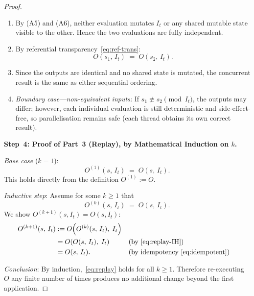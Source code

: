 \documentclass[12pt,openany]{book}
\newcommand{\calI}{\mathcal{I}}
\numberwithin{equation}{chapter}
\theoremstyle{plain}
\theoremstyle{definition}
\theoremstyle{remark}
\numberwithin{equation}{chapter}
\theoremstyle{plain}
\def\calI{I}%
\begin{document}
\begin{proof}
\begin{enumerate}
  \item By (A5) and (A6), neither evaluation mutates $\calI_t$ or any
        shared mutable state visible to the other.  Hence the two
        evaluations are fully independent.
  \item By referential transparency~\eqref{eq:ref-trans}:
        \begin{equation}
          O(s_1,\, \calI_t) \;=\; O(s_2,\, \calI_t).
          \label{eq:parallel-rt}
        \end{equation}
  \item Since the outputs are identical and no shared state is mutated,
        the concurrent result is the same as either sequential ordering.
  \item \emph{Boundary case---non-equivalent inputs:}
        If $s_1 \not\equiv s_2 \pmod{\calI_t}$, the outputs may
        differ; however, each individual evaluation is still
        deterministic and side-effect-free, so parallelisation remains
        safe (each thread obtains its own correct result).
\end{enumerate}

\medskip
\noindent\textbf{Step~4: Proof of Part~3 (Replay),
  by Mathematical Induction on $k$.}

\emph{Base case} ($k = 1$):
\begin{equation}
  O^{(1)}(s,\, \calI_t)
  \;=\; O(s,\, \calI_t).
  \label{eq:replay-base}
\end{equation}
This holds directly from the definition $O^{(1)} := O$.

\emph{Inductive step}: Assume for some $k \geq 1$ that
\begin{equation}
  O^{(k)}(s,\, \calI_t) \;=\; O(s,\, \calI_t).
  \label{eq:replay-IH}
\end{equation}
We show $O^{(k+1)}(s, \calI_t) = O(s, \calI_t)$:
\begin{align}
  O^{(k+1)}(s,\, \calI_t)
    &:= O\!\left(O^{(k)}(s,\, \calI_t),\; \calI_t\right)
    \label{eq:replay-def} \\
    &= O\!\left(O(s,\, \calI_t),\; \calI_t\right)
    \label{eq:replay-IH-sub}
    && \text{(by \eqref{eq:replay-IH})} \\
    &= O(s,\, \calI_t).
    \label{eq:replay-idemp}
    && \text{(by idempotency \eqref{eq:idempotent})}
\end{align}

\emph{Conclusion}: By induction,~\eqref{eq:replay} holds for all
$k \geq 1$.  Therefore re-executing $O$ any finite number of times
produces no additional change beyond the first application.


\end{proof}
\end{document}
